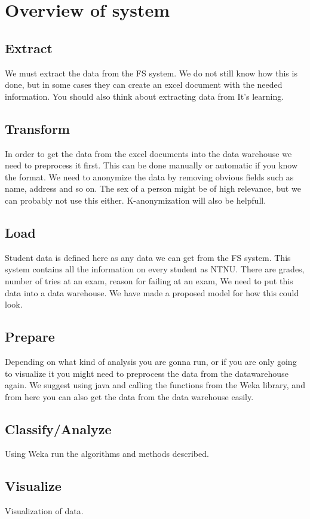 \section{Overview of system}
\subsection{Extract}
We must extract the data from the FS system. We do not still know how this is done, but in some cases they can create an excel document with the needed information.
You should also think about extracting data from It's learning.

\subsection{Transform}
In order to get the data from the excel documents into the data warehouse we need to preprocess it first. This can be done manually or automatic if you know the format.
We need to anonymize the data by removing obvious fields such as name, address and so on.
The sex of a person might be of high relevance, but we can probably not use this either.
K-anonymization will also be helpfull.
\subsection{Load}
Student data is defined here as any data we can get from the FS system. 
This system contains all the information on every student as NTNU.
There are grades, number of tries at an exam, reason for failing at an exam, 
We need to put this data into a data warehouse. We have made a proposed model for how this could look.
\subsection{Prepare}
Depending on what kind of analysis you are gonna run, or if you are only going to visualize it you might need to preprocess the data from the datawarehouse again.
We suggest using java and calling the functions from the Weka library, and from here you can also get the data from the data warehouse easily.
\subsection{Classify/Analyze}
Using Weka run the algorithms and methods described.
\subsection{Visualize}
Visualization of data.